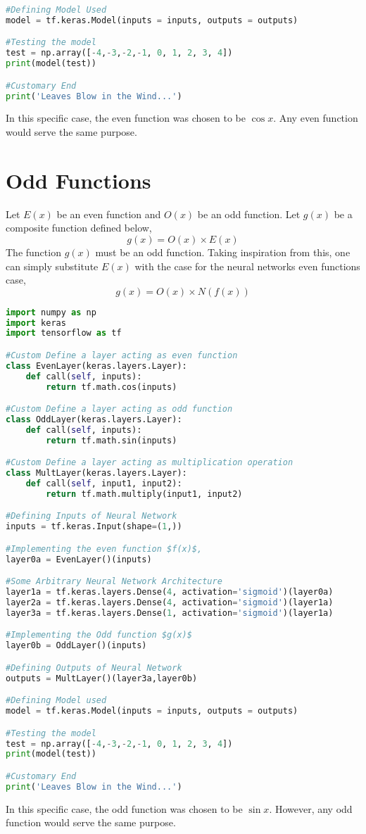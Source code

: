 \documentclass[a4paper, 12pt]{report}
\begin{document}
\begin{center}
\begin{lstlisting}[language = Python]
#Defining Model Used
model = tf.keras.Model(inputs = inputs, outputs = outputs)

#Testing the model
test = np.array([-4,-3,-2,-1, 0, 1, 2, 3, 4])
print(model(test))

#Customary End
print('Leaves Blow in the Wind...')
\end{lstlisting}
In this specific case, the even function was chosen to be $\cos x$. Any even function would serve the same purpose.
\section*{Odd Functions}
\begin{comment}
\end{comment}
Let $E(x)$ be an even function and $O(x)$ be an odd function. Let $g(x)$ be a composite function defined below,
$$g(x) = O(x)\times E(x)$$
The function $g(x)$ must be an odd function. Taking inspiration from this, one can simply substitute $E(x)$ with the case for the neural networks even functions case,
$$g(x) = O(x)\times N(f(x))$$
\begin{lstlisting}[language = Python]
import numpy as np
import keras
import tensorflow as tf

#Custom Define a layer acting as even function
class EvenLayer(keras.layers.Layer):
    def call(self, inputs):
        return tf.math.cos(inputs)

#Custom Define a layer acting as odd function
class OddLayer(keras.layers.Layer):
    def call(self, inputs):
        return tf.math.sin(inputs)

#Custom Define a layer acting as multiplication operation
class MultLayer(keras.layers.Layer):
    def call(self, input1, input2):
        return tf.math.multiply(input1, input2)

#Defining Inputs of Neural Network
inputs = tf.keras.Input(shape=(1,))

#Implementing the even function $f(x)$,
layer0a = EvenLayer()(inputs)

#Some Arbitrary Neural Network Architecture
layer1a = tf.keras.layers.Dense(4, activation='sigmoid')(layer0a)
layer2a = tf.keras.layers.Dense(4, activation='sigmoid')(layer1a)
layer3a = tf.keras.layers.Dense(1, activation='sigmoid')(layer1a)

#Implementing the Odd function $g(x)$
layer0b = OddLayer()(inputs)

#Defining Outputs of Neural Network
outputs = MultLayer()(layer3a,layer0b)

#Defining Model used
model = tf.keras.Model(inputs = inputs, outputs = outputs)

#Testing the model
test = np.array([-4,-3,-2,-1, 0, 1, 2, 3, 4])
print(model(test))

#Customary End
print('Leaves Blow in the Wind...')
\end{lstlisting}
In this specific case, the odd function was chosen to be $\sin x$. However, any odd function would serve the same purpose.
\end{center}
\end{document}
